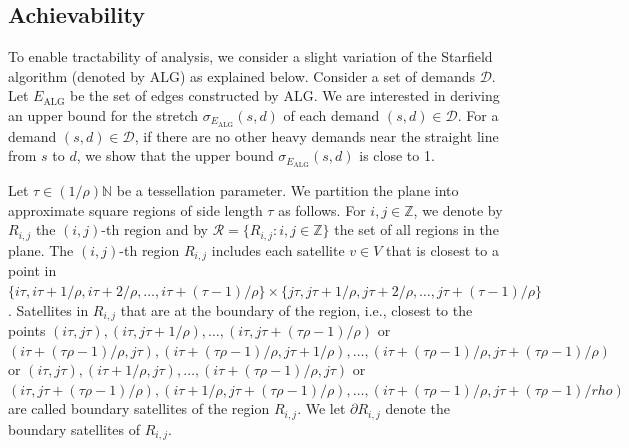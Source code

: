 \documentclass[acmsmall, screen]{acmart}
\begin{document}
\subsection{Achievability}
To enable tractability of analysis, we consider a slight variation of the Starfield algorithm (denoted by $\mathrm{ALG}$) as explained below. 
Consider a set of demands $\mathcal{D}$. 
Let $E_\mathrm{ALG}$ be the set of edges constructed by $\mathrm{ALG}$. 
We are interested in deriving an upper bound for the stretch $\sigma_{E_\mathrm{ALG}}(s,d)$ of each demand $(s,d) \in \mathcal{D}$. 
For a demand $(s,d) \in \mathcal{D}$, if there are no other heavy demands near the straight line from $s$ to $d$, we show that the upper bound $\sigma_{E_\mathrm{ALG}}(s,d)$ is close to 1. 

Let $\tau \in  (1/\rho) \mathbb{N}$ be a tessellation parameter. %
We partition the plane into approximate square regions of side length $\tau$ as follows. 
For $i, j \in \mathbb{Z}$, we denote by $R_{i, j}$ the $(i, j)$-th region and by $\mathcal{R} = \{ R_{i,j}: i, j \in \mathbb{Z} \}$ the set of all regions in the plane. 
The $(i,j)$-th region $R_{i,j}$ includes each satellite $v \in V$ that is closest to a point in $\{ i\tau, i\tau + 1/\rho, i\tau + 2/\rho, \ldots, i\tau + (\tau - 1) / \rho \} \times \{ j\tau, j\tau + 1/\rho, j\tau + 2/\rho, \ldots, j\tau + (\tau - 1) / \rho \} $. 
Satellites in $R_{i,j}$ that are at the boundary of the region, i.e., closest to the points $(i\tau, j\tau), (i\tau, j\tau + 1/\rho), \ldots, (i\tau, j\tau + (\tau\rho - 1)/\rho)$ or $(i\tau + (\tau\rho-1)/\rho, j \tau), (i\tau + (\tau\rho-1)/\rho, j \tau + 1/\rho), \ldots, (i\tau + (\tau\rho-1)/\rho, j \tau + (\tau\rho-1)/\rho)$ or $(i\tau, j\tau), (i\tau + 1/\rho, j\tau), \ldots, (i\tau + (\tau\rho-1)/\rho, j\tau)$ or $(i\tau, j\tau + (\tau\rho-1)/\rho), (i\tau + 1/\rho, j\tau + (\tau\rho-1)/\rho), \ldots, (i\tau + (\tau\rho-1)/\rho, j\tau + (\tau\rho-1)/rho)$ are called boundary satellites of the region $R_{i,j}$.    
We let $\partial R_{i,j}$ denote the boundary satellites of $R_{i,j}$. 
\end{document}
